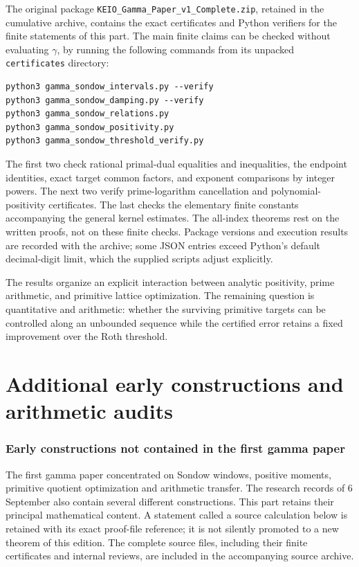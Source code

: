 \documentclass[11pt,a4paper]{article}
\theoremstyle{definition}
\theoremstyle{remark}
\numberwithin{equation}{section}
\begin{document}
The original package \texttt{KEIO\_Gamma\_Paper\_v1\_Complete.zip},
retained in the cumulative archive, contains the exact certificates and
Python verifiers for the finite statements of this part.  The
main finite claims can be checked without evaluating $\gamma$, by running
the following commands from its unpacked \texttt{certificates} directory:
\begin{verbatim}
python3 gamma_sondow_intervals.py --verify
python3 gamma_sondow_damping.py --verify
python3 gamma_sondow_relations.py
python3 gamma_sondow_positivity.py
python3 gamma_sondow_threshold_verify.py
\end{verbatim}
The first two check rational primal-dual equalities and inequalities,
the endpoint identities, exact target common factors, and exponent
comparisons by integer powers.  The next two verify prime-logarithm
cancellation and polynomial-positivity certificates.  The last checks
the elementary finite constants accompanying the general kernel estimates.
The all-index theorems rest on the written proofs, not on these finite
checks.  Package versions and execution results are recorded with the
archive; some JSON entries exceed Python's default decimal-digit limit,
which the supplied scripts adjust explicitly.



The results organize an explicit interaction between analytic positivity,
prime arithmetic, and primitive lattice optimization.  The remaining
question is quantitative and arithmetic: whether the surviving primitive
targets can be controlled along an unbounded sequence while the certified
error retains a fixed improvement over the Roth threshold.




\clearpage
\part{Additional early constructions and arithmetic audits}\label{master:early}
\section{Early constructions not contained in the first gamma paper}
\label{ec:scope}

The first gamma paper concentrated on Sondow windows, positive moments,
primitive quotient optimization and arithmetic transfer.  The research
records of 6 September also contain several different constructions.  This
part retains their principal mathematical content.  A statement called a
source calculation below is retained with its exact proof-file reference;
it is not silently promoted to a new theorem of this edition.  The complete
source files, including their finite certificates and internal reviews,
are included in the accompanying source archive.
\end{document}
